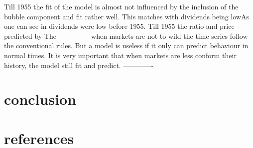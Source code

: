 \documentclass{article}
\begin{document}
Till 1955 the fit of the model is almost not influenced by the inclusion of the bubble component and fit rather well. This matches with dividends being lowAs one can see in  dividends were low before 1955. Till 1955 the ratio and price predicted by  The %
-------------
when markets are not to wild the time series follow the conventional rules. But a model is useless if it only can predict behaviour in normal times. It is very important that when markets are less conform their history, the model still fit and predict.
------------- 




 











\section{conclusion}

\section{references}
\end{document}
